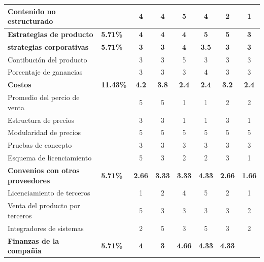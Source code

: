 \begin{table}[htbp]
\begin{center}
{\begin{tabular}{|p{5.5cm}|>{\centering\arraybackslash}m{1.7cm}|c|c|c|c|c|c|}
        \hline
        Contenido no estructurado & & 4 & 4 & 5 & 4 & 2 & 1 \\
        \hline
        \rowcolor[gray]{0.9}\textbf{Estrategias de producto}
        & \textbf{5.71\%}
        & \textbf{4}
        & \textbf{4}
        & \textbf{4}
        & \textbf{5}
        & \textbf{5}
        & \textbf{3}\\
        \hline
        \rowcolor[gray]{0.9}\textbf{strategias corporativas}
        & \textbf{5.71\%}
        & \textbf{3}
        &\textbf{ 3}
        & \textbf{4}
        & \textbf{3.5}
        & \textbf{3}
        & \textbf{3}\\
        \hline
        Contibución del producto & & 3 & 3 & 5 & 3 & 3 & 3 \\
        \hline
        Porcentaje de ganancias & & 3 & 3 & 3 & 4 & 3 & 3 \\
        \hline
        \rowcolor[gray]{0.9}\textbf{Costos}
        & \textbf{11.43\%}
        & \textbf{4.2}
        & \textbf{3.8}
        & \textbf{2.4}
        & \textbf{2.4}
        & \textbf{3.2}
        & \textbf{2.4}\\
        \hline
        Promedio del percio de venta & & 5 & 5 & 1 & 1 & 2 & 2 \\
        \hline
        Estructura de precios & & 3 & 3 & 1 & 1 & 3 & 1 \\
        \hline
        Modularidad de precios & & 5 & 5 & 5 & 5 & 5 & 5 \\
        \hline
        Pruebas de concepto & & 3 & 3 & 3 & 3 & 3 & 3 \\
        \hline
        Esquema de licenciamiento & & 5 & 3 & 2 & 2 & 3 & 1 \\
        \hline
        \rowcolor[gray]{0.9}\textbf{Convenios con otros proveedores}
        & \textbf{5.71\%}
        & \textbf{2.66}
        & \textbf{3.33}
        & \textbf{3.33}
        & \textbf{4.33}
        & \textbf{2.66}
        & \textbf{1.66}\\
        \hline
        Licenciamiento de terceros & & 1 & 2 & 4 & 5 & 2 & 1 \\
        \hline
        Venta del producto por terceros & & 5 & 3 & 3 & 3 & 3 & 2 \\
        \hline
        Integradores de sistemas & & 2 & 5 & 3 & 5 & 3 & 2 \\
        \hline
        \rowcolor[gray]{0.9}\textbf{Finanzas de la compañia}
        & \textbf{5.71\%}
        & \textbf{4}
        & \textbf{3}
        & \textbf{4.66}
        & \textbf{4.33}
        & \textbf{4.33}

\end{tabular}}
\end{center}
\end{table}
